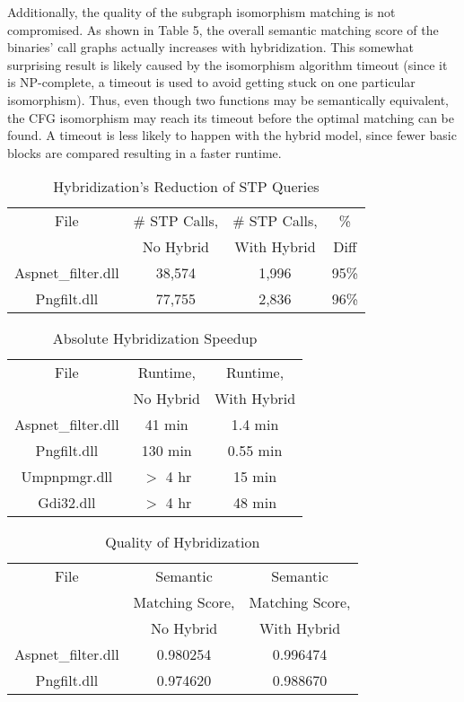 \documentclass[11pt,twocolumn]{article}
\begin{document}
Additionally, the quality of the subgraph isomorphism matching is not compromised.  As shown in Table 5, the overall semantic matching score of the binaries' call graphs actually increases with hybridization.  This somewhat surprising result is likely caused by the isomorphism algorithm timeout (since it is NP-complete, a timeout is used to avoid getting stuck on one particular isomorphism).  Thus, even though two functions may be semantically equivalent, the CFG isomorphism may reach its timeout before the optimal matching can be found.  A timeout is less likely to happen with the hybrid model, since fewer basic blocks are compared resulting in a faster runtime.


\begin{table}[t]
\caption{Hybridization's Reduction of STP Queries }
\centering
\begin{tabular}{ c c c c }
\hline \hline
File & {\small \# STP Calls, }&  {\small \# STP Calls,}  & \% \\
 & {\small No Hybrid } & {\small With Hybrid}  & Diff \\
\hline
{\small Aspnet\_filter.dll} & 38,574 & 1,996 & 95\%  \\
{\small Pngfilt.dll} & 77,755 &  2,836  & 96\% \\
\end{tabular}
\end{table}


\begin{table}[t]
\caption{Absolute Hybridization Speedup  }
\centering
\begin{tabular}{ c c c  }
\hline \hline
File & {\small Runtime,} &  {\small Runtime,}  \\
& {\small No Hybrid} &  {\small With Hybrid}  \\
\hline
{\small Aspnet\_filter.dll} & 41 min & 1.4 min  \\
{\small Pngfilt.dll} & 130 min &  0.55 min  \\
{\small Umpnpmgr.dll} & $>$ 4 hr\footnotemark[2] &  15 min  \\
{\small Gdi32.dll} & $>$ 4 hr\footnotemark[2] &  48 min  \\

\end{tabular}
\end{table}

\begin{table}[t]
\caption{Quality of Hybridization  }
\centering
\begin{tabular}{ c c c  }
\hline \hline
File & {\small Semantic} &  {\small Semantic}  \\
& {\small Matching Score,} &  {\small Matching Score,}  \\
 & {\small No Hybrid} &{\small  With Hybrid} \\
\hline
{\small Aspnet\_filter.dll} & 0.980254 & 0.996474  \\
{\small Pngfilt.dll} & 0.974620 &  0.988670  \\
\end{tabular}
\end{table}
\end{document}
